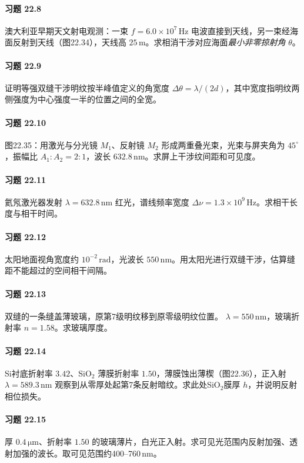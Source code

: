 \paragraph{习题 22.8}
澳大利亚早期天文射电观测：一束 \(f=6.0\times10^7\,\mathrm{Hz}\) 电波直接到天线，另一束经海面反射到天线（图22.34），天线高 \(25\,\mathrm m\)。求相消干涉对应海面\emph{最小非零掠射角} \(\theta\)。
\paragraph{习题 22.9}
证明等强双缝干涉明纹按半峰值定义的角宽度 \(\Delta\theta=\lambda/(2d)\)，其中宽度指明纹两侧强度为中心强度一半的位置之间的全宽。
\paragraph{习题 22.10}
图22.35：用激光与分光镜 \(M_1\)、反射镜 \(M_2\) 形成两重叠光束，光束与屏夹角为 \(45^\circ\)，振幅比 \(A_1:A_2=2:1\)，波长 \(632.8\,\mathrm{nm}\)。求屏上干涉纹间距和可见度。
\paragraph{习题 22.11}
氦氖激光器发射 \(\lambda=632.8\,\mathrm{nm}\) 红光，谱线频率宽度 \(\Delta\nu=1.3\times10^9\,\mathrm{Hz}\)。求相干长度与相干时间。
\paragraph{习题 22.12}
太阳地面视角宽度约 \(10^{-2}\,\mathrm{rad}\)，光波长 \(550\,\mathrm{nm}\)。用太阳光进行双缝干涉，估算缝距不能超过的空间相干间隔。
\paragraph{习题 22.13}
双缝的一条缝盖薄玻璃，原第7级明纹移到原零级明纹位置。 \(\lambda=550\,\mathrm{nm}\)，玻璃折射率 \(n=1.58\)。求玻璃厚度。
\paragraph{习题 22.14}
Si衬底折射率 \(3.42\)、SiO\(_2\) 薄膜折射率 \(1.50\)，薄膜蚀出薄楔（图22.36），正入射 \(\lambda=589.3\,\mathrm{nm}\) 观察到从零厚处起第7条反射暗纹。求此处SiO\(_2\)膜厚 \(h\)，并说明反射相位损失。
\paragraph{习题 22.15}
厚 \(0.4\,\mathrm{\mu m}\)、折射率 \(1.50\) 的玻璃薄片，白光正入射。求可见光范围内反射加强、透射加强的波长。取可见范围约400--760\,nm。
